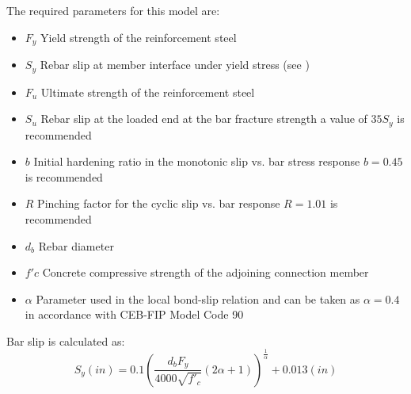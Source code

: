 The required parameters for this model are:
\begin{itemize}
	\item $F_{y}$ Yield strength of the reinforcement steel
	\item $S_{y}$ Rebar slip at member interface under yield stress (see )
	\item $F_{u}$ Ultimate strength of the reinforcement steel
	\item $S_{u}$ Rebar slip at the loaded end at the bar fracture strength a value of $35 S_{y}$ is recommended \cite{Zhao2007}
	\item $b$ Initial hardening ratio in the monotonic slip vs. bar stress response $b=0.45$ is recommended \cite{Zhao2007}
	\item $R$ Pinching factor for the cyclic slip vs. bar response $R=1.01$ is recommended \cite{Zhao2007}
	\item $d_b$ Rebar diameter
	\item $f'c$ Concrete compressive strength of the adjoining connection member
	\item $\alpha$ Parameter used in the local bond-slip relation and can be taken as $\alpha=0.4$ in accordance with CEB-FIP Model Code 90 \cite{CEB1993}
\end{itemize}

Bar slip is calculated as:
\begin{equation}
	S_{y}(in)=0.1\left(\frac{d_{b}F_{y}}{4000\sqrt{f'_{c}}}\left(2\alpha+1\right)\right)^{\frac{1}{\alpha}}+0.013 (in)
	\label{eq.Rebar_Slip}
\end{equation}
